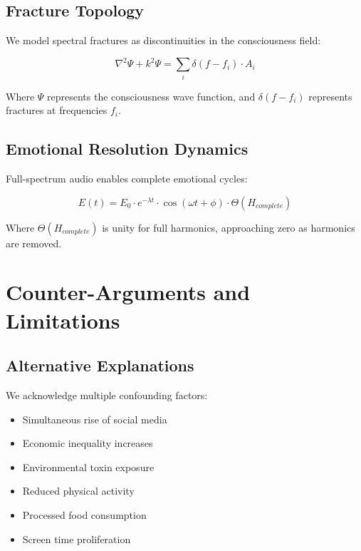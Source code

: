 \documentclass[12pt,a4paper]{article}
\begin{document}
\subsection{Fracture Topology}

We model spectral fractures as discontinuities in the consciousness field:

\begin{equation}
\nabla^2 \Psi + k^2 \Psi = \sum_i \delta(f - f_i) \cdot A_i
\end{equation}

Where $\Psi$ represents the consciousness wave function, and $\delta(f - f_i)$ represents fractures at frequencies $f_i$.

\subsection{Emotional Resolution Dynamics}

Full-spectrum audio enables complete emotional cycles:

\begin{equation}
E(t) = E_0 \cdot e^{-\lambda t} \cdot \cos(\omega t + \phi) \cdot \Theta(H_{complete})
\end{equation}

Where $\Theta(H_{complete})$ is unity for full harmonics, approaching zero as harmonics are removed.

\section{Counter-Arguments and Limitations}

\subsection{Alternative Explanations}

We acknowledge multiple confounding factors:

\begin{itemize}
\item Simultaneous rise of social media
\item Economic inequality increases
\item Environmental toxin exposure
\item Reduced physical activity
\item Processed food consumption
\item Screen time proliferation
\end{itemize}
\end{document}

